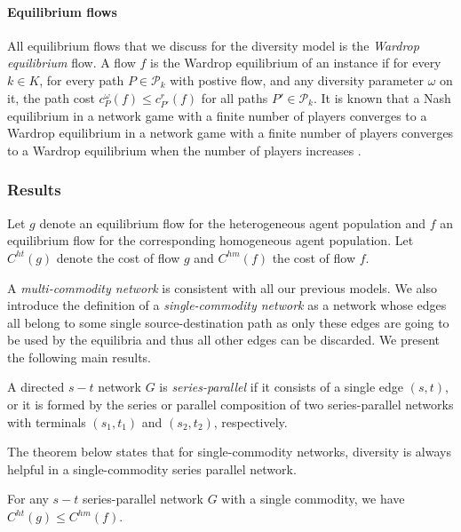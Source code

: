 \paragraph{Equilibrium flows} All equilibrium flows that we discuss for the diversity model is the {\it Wardrop equilibrium} flow. A flow $f$ is the Wardrop equilibrium of an instance if for every $k\in K$, for every path $P\in \mathcal{P}_k$ with postive flow, and any diversity parameter $\omega$ on it, the path cost $c_P^\omega(f)\le c_{P'}^r(f)$ for all paths $P'\in \mathcal{P}_k$. It is known that a Nash equilibrium in a network game with a finite number of players converges to a Wardrop equilibrium in a network game with a finite number of players converges to a Wardrop equilibrium when the number of players increases \cite{haurie}.

\subsubsection{Results}
Let $g$ denote an equilibrium flow for the heterogeneous agent population and $f$ an equilibrium flow for the corresponding homogeneous agent population. Let $C^{ht}(g)$ denote the cost of flow $g$ and $C^{hm}(f)$ the cost of flow $f$. 

A {\it multi-commodity network} is consistent with all our previous models. We also introduce the definition of a {\it single-commodity network} as a network whose edges all belong to some single source-destination path as only these edges are going to be used by the equilibria and thus all other edges can be discarded. We present the following main results.

\begin{definition}
A directed $s-t$ network $G$ is {\it series-parallel} if it consists of a single edge $(s, t)$, or it is formed by the series or parallel composition of two series-parallel networks with terminals $(s_1, t_1)$ and $(s_2, t_2)$, respectively.
\end{definition}

The theorem below states that for single-commodity networks, diversity is always helpful in a single-commodity series parallel network.

\begin{theorem}
For any $s-t$ series-parallel network $G$ with a single commodity, we have $C^{ht}(g)\le C^{hm}(f)$.
\label{diverse1}
\end{theorem}

